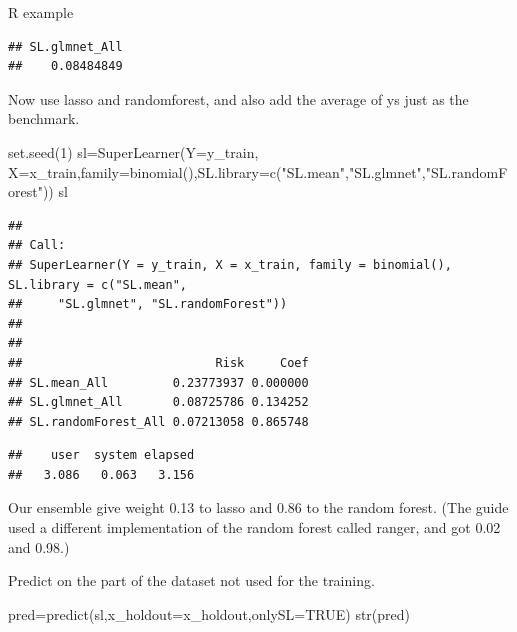 \documentclass[
  ignorenonframetext,
]{beamer}
\newenvironment{Shaded}{\begin{snugshade}}{\end{snugshade}}
\newcommand{\AttributeTok}[1]{\textcolor[rgb]{0.77,0.63,0.00}{#1}}
\newcommand{\ConstantTok}[1]{\textcolor[rgb]{0.00,0.00,0.00}{#1}}
\newcommand{\DecValTok}[1]{\textcolor[rgb]{0.00,0.00,0.81}{#1}}
\newcommand{\FunctionTok}[1]{\textcolor[rgb]{0.00,0.00,0.00}{#1}}
\newcommand{\NormalTok}[1]{#1}
\newcommand{\OtherTok}[1]{\textcolor[rgb]{0.56,0.35,0.01}{#1}}
\newcommand{\SpecialCharTok}[1]{\textcolor[rgb]{0.00,0.00,0.00}{#1}}
\newcommand{\StringTok}[1]{\textcolor[rgb]{0.31,0.60,0.02}{#1}}
\begin{document}
\begin{frame}[fragile]
\begin{block}{R example}
\begin{verbatim}
## SL.glmnet_All 
##    0.08484849
\end{verbatim}

Now use lasso and randomforest, and also add the average of ys just as
the benchmark.

\begin{Shaded}
\begin{Highlighting}[]
\FunctionTok{set.seed}\NormalTok{(}\DecValTok{1}\NormalTok{)}
\NormalTok{sl}\OtherTok{=}\FunctionTok{SuperLearner}\NormalTok{(}\AttributeTok{Y=}\NormalTok{y\_train, }\AttributeTok{X=}\NormalTok{x\_train,}\AttributeTok{family=}\FunctionTok{binomial}\NormalTok{(),}\AttributeTok{SL.library=}\FunctionTok{c}\NormalTok{(}\StringTok{"SL.mean"}\NormalTok{,}\StringTok{"SL.glmnet"}\NormalTok{,}\StringTok{"SL.randomForest"}\NormalTok{))}
\NormalTok{sl}
\end{Highlighting}
\end{Shaded}

\begin{verbatim}
## 
## Call:  
## SuperLearner(Y = y_train, X = x_train, family = binomial(), SL.library = c("SL.mean",  
##     "SL.glmnet", "SL.randomForest")) 
## 
## 
##                           Risk     Coef
## SL.mean_All         0.23773937 0.000000
## SL.glmnet_All       0.08725786 0.134252
## SL.randomForest_All 0.07213058 0.865748
\end{verbatim}

\begin{Shaded}
\end{Shaded}

\begin{verbatim}
##    user  system elapsed 
##   3.086   0.063   3.156
\end{verbatim}

Our ensemble give weight 0.13 to lasso and 0.86 to the random forest.
(The guide used a different implementation of the random forest called
ranger, and got 0.02 and 0.98.)

Predict on the part of the dataset not used for the training.

\begin{Shaded}
\begin{Highlighting}[]
\NormalTok{pred}\OtherTok{=}\FunctionTok{predict}\NormalTok{(sl,}\AttributeTok{x\_holdout=}\NormalTok{x\_holdout,}\AttributeTok{onlySL=}\ConstantTok{TRUE}\NormalTok{)}
\FunctionTok{str}\NormalTok{(pred)}
\end{Highlighting}
\end{Shaded}


\end{block}
\end{frame}
\end{document}
